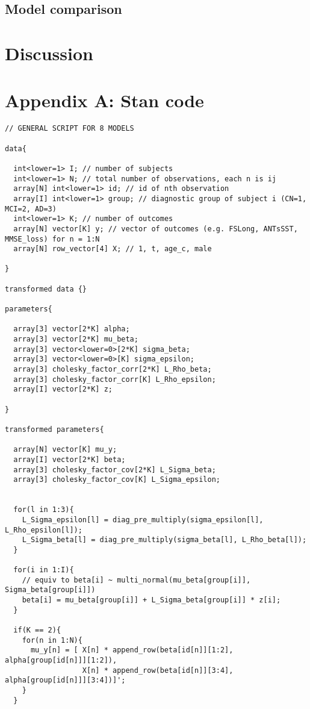 \documentclass[12pt]{article}
\begin{document}
\subsection{Model comparison}

\section{Discussion}

\section{Appendix A: Stan code}

\begin{verbatim}
// GENERAL SCRIPT FOR 8 MODELS

data{
  
  int<lower=1> I; // number of subjects
  int<lower=1> N; // total number of observations, each n is ij
  array[N] int<lower=1> id; // id of nth observation
  array[I] int<lower=1> group; // diagnostic group of subject i (CN=1, MCI=2, AD=3)
  int<lower=1> K; // number of outcomes
  array[N] vector[K] y; // vector of outcomes (e.g. FSLong, ANTsSST, MMSE_loss) for n = 1:N
  array[N] row_vector[4] X; // 1, t, age_c, male
  
}

transformed data {}

parameters{
  
  array[3] vector[2*K] alpha;
  array[3] vector[2*K] mu_beta; 
  array[3] vector<lower=0>[2*K] sigma_beta; 
  array[3] vector<lower=0>[K] sigma_epsilon; 
  array[3] cholesky_factor_corr[2*K] L_Rho_beta; 
  array[3] cholesky_factor_corr[K] L_Rho_epsilon; 
  array[I] vector[2*K] z;

}

transformed parameters{
  
  array[N] vector[K] mu_y; 
  array[I] vector[2*K] beta; 
  array[3] cholesky_factor_cov[2*K] L_Sigma_beta;
  array[3] cholesky_factor_cov[K] L_Sigma_epsilon; 

  
  for(l in 1:3){
    L_Sigma_epsilon[l] = diag_pre_multiply(sigma_epsilon[l], L_Rho_epsilon[l]);
    L_Sigma_beta[l] = diag_pre_multiply(sigma_beta[l], L_Rho_beta[l]);    
  }
  
  for(i in 1:I){
    // equiv to beta[i] ~ multi_normal(mu_beta[group[i]], Sigma_beta[group[i]])
    beta[i] = mu_beta[group[i]] + L_Sigma_beta[group[i]] * z[i];
  }

  if(K == 2){
    for(n in 1:N){
      mu_y[n] = [ X[n] * append_row(beta[id[n]][1:2], alpha[group[id[n]]][1:2]),
                  X[n] * append_row(beta[id[n]][3:4], alpha[group[id[n]]][3:4])]';
    }
  }


\end{verbatim}
\end{document}
